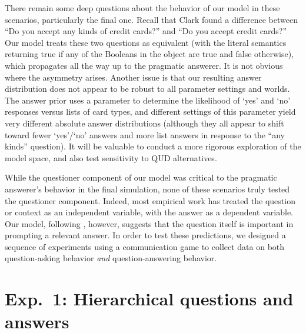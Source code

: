 \documentclass[12pt, floatsintext, man]{apa6}
\begin{document}
There remain some deep questions about the behavior of our model in these scenarios, particularly the final one. Recall that Clark found a difference between ``Do you accept any kinds of credit cards?'' and ``Do you accept credit cards?'' Our model treats these two questions as equivalent (with the literal semantics returning true if any of the Booleans in the object are true and false otherwise), which propagates all the way up to the pragmatic answerer. It is not obvious where the asymmetry arises. Another issue is that our resulting answer distribution does not appear to be robust to all parameter settings and worlds. The answer prior uses a parameter to determine the likelihood of `yes' and `no' responses versus lists of card types, and different settings of this parameter yield very different absolute answer distributions (although they all appear to shift toward fewer `yes'/`no' answers and more list answers in response to the ``any kinds'' question). It will be valuable to conduct a more rigorous exploration of the model space, and also test sensitivity to QUD alternatives. 

While the questioner component of our model was critical to the pragmatic answerer's behavior in the final simulation, none of these scenarios truly tested the questioner component.  Indeed, most empirical work has treated the question or context as an independent variable, with the answer as a dependent variable. Our model, following , however, suggests that the question itself is important in prompting a relevant answer. In order to test these predictions, we designed a sequence of experiments using a communication game to collect data on both question-asking behavior \emph{and} question-answering behavior.

\section{Exp.~1: Hierarchical questions and answers}
\end{document}
